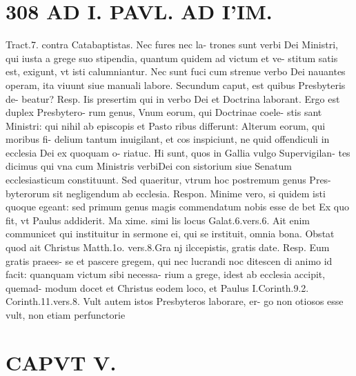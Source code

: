 \documentclass{article}
\begin{document}
\begin{pages}
\section*{308 AD I. PAVL. AD I'IM. }\pstart Tract.7. contra Catabaptistas. Nec fures nec la- trones sunt verbi Dei Ministri, qui iusta a grege suo stipendia, quantum quidem ad victum et ve- stitum satis est, exigunt, vt isti calumniantur. Nec sunt fuci cum strenue verbo Dei nauantes operam, ita viuunt siue manuali labore. Secundum caput, est quibus Presbyteris de- beatur? Resp. Iis presertim qui in verbo Dei et Doctrina laborant. Ergo est duplex Presbytero- rum genus, Vnum eorum, qui Doctrinae coele- stis sant Ministri: qui nihil ab episcopis et Pasto ribus differunt: Alterum eorum, qui moribus fi- delium tantum inuigilant, et cos inspiciunt, ne quid offendiculi in ecclesia Dei ex quoquam o- riatuc. Hi sunt, quos in Gallia vulgo Supervigilan- tes dicimus qui vna cum Ministris verbiDei con sistorium siue Senatum ecclesiasticum constituunt. Sed quaeritur, vtrum hoc postremum genus Pres- byterorum sit negligendum ab ecclesia. Respon. Minime vero, si quidem isti quoque egeant: sed primum genus magis commendatum nobis esse de bet Ex quo fit, vt Paulus addiderit. Ma xime. simi lis locus Galat.6.vers.6. Ait enim communicet qui instituitur in sermone ei, qui se irstituit, omnia bona. Obstat quod ait Christus Matth.1o. vers.8.Gra nj ilccepistis, gratis date. Resp. Eum gratis praees- se et pascere gregem, qui nec lucrandi noc ditescen di animo id facit: quanquam victum sibi necessa- rium a grege, idest ab ecclesia accipit, quemad- modum docet et Christus eodem loco, et Paulus I.Corinth.9.2. Corinth.11.vers.8. Vult autem istos Presbyteros laborare, er- go non otiosos esse vult, non etiam perfunctorie  \pend
\section*{CAPVT  V. }
\marginpar{[ p.309 ]}\pstart {}
{}

\end{pages}
\end{document}
